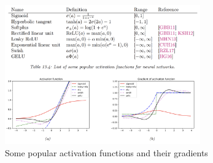 \begin{figure}[htpb]
    \centering
    \includegraphics[width=0.75\textwidth]{figs/activationfunc.png}
    \caption{Some popular activation functions and their gradients}
    \label{fig:activationfunc}
\end{figure}
